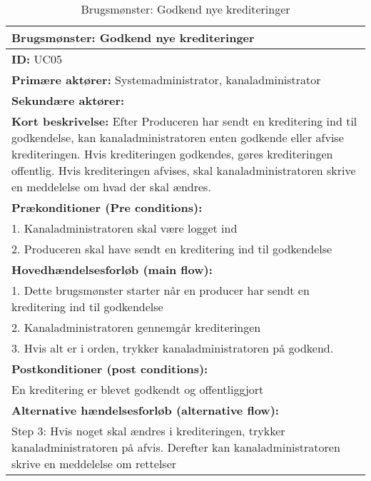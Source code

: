 \begin{table}[H]
    \begin{tabularx}{\textwidth}{|X|}
            \hline
            \textbf{Brugsmønster:}  Godkend nye krediteringer \\ 
            \hline
        	\textbf{ID:} UC05 \\ 
        	\hline
        	\textbf{Primære aktører:} Systemadministrator, kanaladministrator \\ \hline
        	\textbf{Sekundære aktører:} \\ \hline
        	\textbf{Kort beskrivelse:} Efter Produceren har sendt en kreditering ind til godkendelse, kan kanaladministratoren enten godkende eller afvise krediteringen. Hvis krediteringen godkendes, gøres krediteringen offentlig. Hvis krediteringen afvises, skal kanaladministratoren skrive en meddelelse om hvad der skal ændres. \\ \hline
        	\textbf{Prækonditioner (Pre conditions):} \\
        	1. Kanaladministratoren skal være logget ind \\ 
        	2. Produceren skal have sendt en kreditering ind til godkendelse \\
        	\hline
        \textbf{Hovedhændelsesforløb (main flow):} \\
        1. Dette brugsmønster starter når en producer har sendt en kreditering ind til godkendelse \\ 
        2. Kanaladministratoren gennemgår krediteringen \\ 
        3. Hvis alt er i orden, trykker kanaladministratoren på godkend.\\ \hline
        \textbf{Postkonditioner (post conditions):} \\
            En kreditering er blevet godkendt og offentliggjort \\ \hline
        \textbf{Alternative hændelsesforløb (alternative flow):} \\
        Step 3: Hvis noget skal ændres i krediteringen, trykker kanaladministratoren på afvis. Derefter kan kanaladministratoren skrive en meddelelse om rettelser \\
        \hline
    \end{tabularx}
    \caption{Brugsmønster: Godkend nye krediteringer}
    \label{table:approve_credit}
\end{table}


